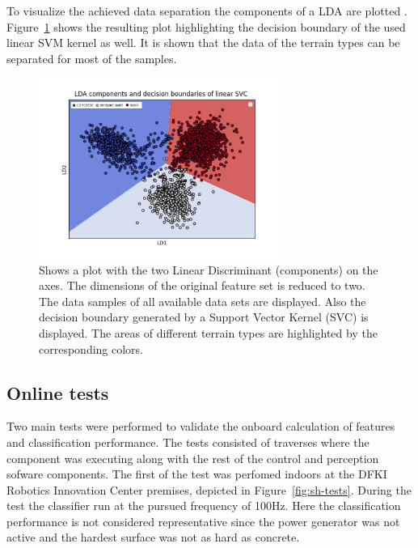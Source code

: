 \documentclass{article}
\begin{document}
To visualize the achieved data separation the components of a LDA are plotted . Figure~\ref{fig:lda} shows the resulting plot highlighting the decision boundary of the used linear SVM kernel as well. It is shown that the data of the terrain types can be separated for most of the samples.
\begin{figure}[!htb]
 \centering
 \includegraphics[width=0.7\textwidth]{../figures/boundary_LDA_prevTesting_all_sand_concrete_compactsand.png}
 \caption{Shows a plot with the two Linear Discriminant (components) on the axes. The dimensions of the original feature set is reduced to two. The data samples of all available data sets are displayed. Also the decision boundary generated by a Support Vector Kernel (SVC) is displayed. The areas of different terrain types are highlighted by the corresponding colors. }
 \label{fig:lda}
\end{figure}








\subsection{Online tests}

Two main tests were performed to validate the onboard calculation of features and classification performance.
The tests consisted of traverses where the component was executing along with the rest of the control and perception sofware components. 
The first of the test was perfomed indoors at the DFKI Robotics Innovation Center premises, depicted in Figure~\ref{fig:sh-tests}.
During the test the classifier run at the pursued frequency of 100Hz.
Here the classification performance is not considered representative since the power generator was not active and the hardest surface was not as hard as concrete. 
\end{document}
